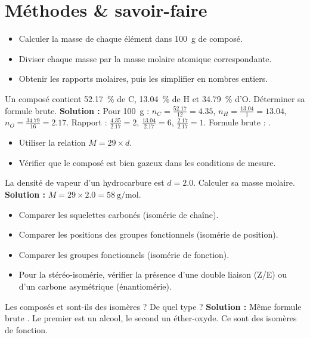 \section{Méthodes \& savoir-faire}

\begin{itemize}
    \item Calculer la masse de chaque élément dans \SI{100}{\gram} de composé.
    \item Diviser chaque masse par la masse molaire atomique correspondante.
    \item Obtenir les rapports molaires, puis les simplifier en nombres entiers.
\end{itemize}
\begin{exemple}
Un composé contient \SI{52.17}{\%} de C, \SI{13.04}{\%} de H et \SI{34.79}{\%} d'O. Déterminer sa formule brute.
\noindent \textbf{Solution :} Pour \SI{100}{\gram} : $n_C = \frac{52.17}{12} = 4.35$, $n_H = \frac{13.04}{1} = 13.04$, $n_O = \frac{34.79}{16} = 2.17$. Rapport : $\frac{4.35}{2.17} = 2$, $\frac{13.04}{2.17} = 6$, $\frac{2.17}{2.17} = 1$. Formule brute : .
\end{exemple}

\begin{itemize}
    \item Utiliser la relation $M = 29 \times d$.
    \item Vérifier que le composé est bien gazeux dans les conditions de mesure.
\end{itemize}
\begin{exemple}
La densité de vapeur d'un hydrocarbure est $d = \num{2.0}$. Calculer sa masse molaire.
\noindent \textbf{Solution :} $M = 29 \times 2.0 = \SI{58}{\gram\per\mol}$.
\end{exemple}

\begin{itemize}
    \item Comparer les squelettes carbonés (isomérie de chaîne).
    \item Comparer les positions des groupes fonctionnels (isomérie de position).
    \item Comparer les groupes fonctionnels (isomérie de fonction).
    \item Pour la stéréo-isomérie, vérifier la présence d'une double liaison (Z/E) ou d'un carbone asymétrique (énantiomérie).
\end{itemize}
\begin{exemple}
Les composés  et  sont-ils des isomères ? De quel type ?
\noindent \textbf{Solution :} Même formule brute . Le premier est un alcool, le second un éther-oxyde. Ce sont des isomères de fonction.
\end{exemple}


